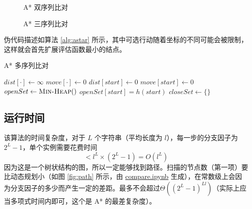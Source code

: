     \begin{figure}[h]
        \centering
        \begin{minipage}{0.48\textwidth}
            \centering
            
            \caption{A* 双序列比对}\label{fig:pairwiseastar}
        \end{minipage}
        \begin{minipage}{0.48\textwidth}
            \centering
            
            \caption{A* 三序列比对}\label{fig:multipleastar}
        \end{minipage}
    \end{figure}

    伪代码描述如算法 \ref{alg:astar} 所示\cite{astarwiki}，其中可选行动随着坐标的不同可能会被限制，这样就会首先扩展评估函数最小的结点。

    \begin{algorithm}[h]
        \caption{A* 多序列比对}\label{alg:astar}
        \BlankLine
        $dist[\cdot]\leftarrow\infty$\;
        $move[\cdot]\leftarrow 0$\;
        $dist[start]\leftarrow 0$\;
        $move[start]\leftarrow 0$\;
        $openSet\leftarrow\textsc{Min-Heap}()$\;
        $openSet[start]=h(start)$\;
        $closeSet\leftarrow \{\}$\;
        \Return{$\infty$}\;
    \end{algorithm}


    \subsection{运行时间}

    该算法的时间复杂度，对于 $L$ 个字符串（平均长度为 $l$），每一步的分支因子为 $2^{L}-1$，单个实例需要花费时间
    \begin{equation}
     < l^L \times (2^L-1) = O(l^L)
    \end{equation}
    因为这是一个树状结构的图，所以一定能够找到路径。扫描的节点数（第一项）要比动态规划小（如图 \ref{fig:path} 所示，由 \href{./compare.ipynb}{\ttfamily compare.ipynb} 生成），在常数级上会因为分支因子的多少而产生一定的差距。最多不会超过$\Theta((2^L-1)^{Ll})$（实际上应当多项式时间内即可，这个是 A* 的最差复杂度）。

